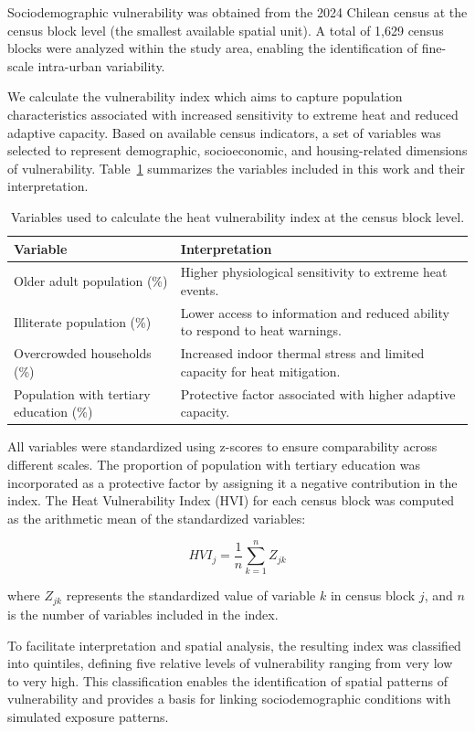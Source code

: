 \documentclass{wscpaperproc}
\theoremstyle{wsc}
\begin{document}
Sociodemographic vulnerability was obtained from the 2024 Chilean census at  the census block level (the smallest available spatial unit). A total of 1,629 census blocks were analyzed within the study area, enabling the identification of fine-scale intra-urban variability.

We calculate the vulnerability  index which aims to capture population characteristics associated with increased sensitivity to extreme heat and reduced adaptive capacity. Based on available census indicators, a set of variables was selected to represent demographic, socioeconomic, and housing-related dimensions of vulnerability. Table~\ref{tab:vulnerability_variables} summarizes the variables included in this work and their interpretation.

\begin{table}[ht]
\caption{Variables used to calculate the heat vulnerability index at the census block level.}
\centering
\begin{tabular}{p{5cm} p{8cm}}
\hline
\textbf{Variable} & \textbf{Interpretation} \\
\hline
Older adult population (\%) & Higher physiological sensitivity to extreme heat events. \\
Illiterate population (\%) & Lower access to information and reduced ability to respond to heat warnings. \\
Overcrowded households (\%) & Increased indoor thermal stress and limited capacity for heat mitigation. \\
Population with tertiary education (\%) & Protective factor associated with higher adaptive capacity. \\
\hline
\end{tabular}
\label{tab:vulnerability_variables}
\end{table}

All variables were standardized using z-scores to ensure comparability across different scales. The proportion of population with tertiary education was incorporated as a protective factor by assigning it a negative contribution in the index. The Heat Vulnerability Index (HVI) for each census block was computed as the arithmetic mean of the standardized variables:

\[
HVI_j = \frac{1}{n} \sum_{k=1}^{n} Z_{jk}
\]

where \(Z_{jk}\) represents the standardized value of variable \(k\) in census block \(j\), and \(n\) is the number of variables included in the index.

To facilitate interpretation and spatial analysis, the resulting index was classified into quintiles, defining five relative levels of vulnerability ranging from very low to very high. This classification enables the identification of spatial patterns of vulnerability and provides a basis for linking sociodemographic conditions with simulated exposure patterns.
\end{document}
